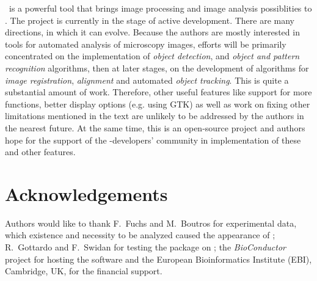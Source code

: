 \EBImage\ is a powerful tool that brings image processing and image analysis possiblities to \R{}. The project is currently in the stage of active development. There are many directions, in which it can evolve. Because the authors are mostly interested in tools for automated analysis of microscopy images, efforts will be primarily concentrated on the implementation of {\em object detection}, and {\em object and pattern recognition} algorithms, then at later stages, on the development of algorithms for {\em image registration}, {\em alignment} and automated {\em object tracking}. This is quite a substantial amount of work. Therefore, other useful features like support for more  functions, better display options (e.g. using GTK) as well as work on fixing other limitations mentioned in the text are unlikely to be addressed by the authors in the nearest future. At the same time, this is an open-source project and authors hope for the support of the \R{}-developers' community in implementation of these and other features.

\begin{figure}
\vspace*{.1in}
\end{figure}

\section*{Acknowledgements}

Authors would like to thank F.~Fuchs and M.~Boutros for experimental data, which existence and necessity to be analyzed caused the appearance of \EBImage; R.~Gottardo and F.~Swidan for testing the package on ; the {\em BioConductor} project for hosting the software and the European Bioinformatics Institute (EBI), Cambridge, UK, for the financial support.

